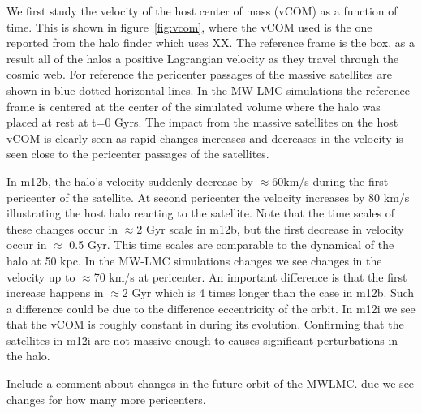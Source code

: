 \documentclass{aastex63}
\begin{document}

We first study the velocity of the host center of mass (vCOM) as a function of time. This is shown in figure~\ref{fig:vcom}, where the vCOM used is the one reported from the halo finder which uses XX. The reference frame is the box, as a result all of the halos a positive Lagrangian velocity as they travel through the cosmic web. For reference the pericenter passages of the massive satellites are shown in blue dotted horizontal lines. In the MW-LMC simulations the reference frame is centered at the center of the simulated volume where the halo was placed at rest at t=0 Gyrs. The impact from the massive satellites on the host vCOM is clearly seen as rapid changes increases and decreases in the velocity is seen close to the pericenter passages of the satellites. 

In m12b, the halo's velocity suddenly decrease by $\approx 60$km/s during the first pericenter of the satellite. At second pericenter the velocity increases by $80$ km/s illustrating the host halo reacting to the satellite. Note that the time scales of these changes occur in $\approx$2 Gyr scale in m12b, but the first decrease in velocity occur in $\approx$ 0.5 Gyr. This time scales are comparable to the dynamical of the halo at 50 kpc. In the MW-LMC simulations changes we see changes in the velocity up to $\approx$70 km/s at pericenter. An important difference is that the first increase happens in $\approx$2 Gyr which is 4 times longer than the case in m12b. Such a difference could be due to the difference eccentricity of the orbit. In m12i we see that the vCOM is roughly constant in during its evolution. Confirming that the satellites in m12i are not massive enough to causes significant perturbations in the halo. 

Include a comment about changes in the future orbit of the MWLMC. due we see changes for how many more pericenters. 
\end{document}
